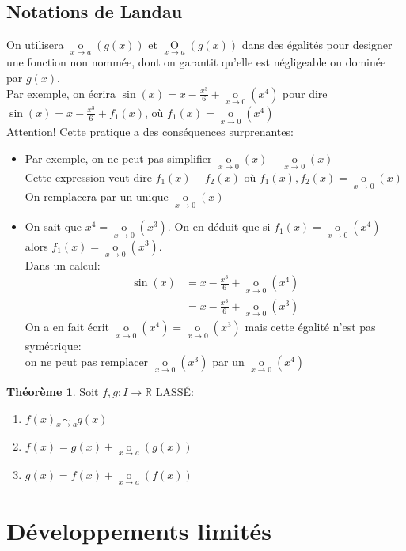 \documentclass[10pt,a4paper]{article}
\theoremstyle{definition}
\newtheorem{theorem}[proposition]{Théorème}
\DeclareMathOperator*{\eqv}{\sim}
\DeclareMathOperator*{\negl}{o}
\DeclareMathOperator*{\dom}{O}
\begin{document}
\pagebreak

\subsection{Notations de Landau}
On utilisera $\negl\limits_{x \to a}(g(x))$ et $\dom\limits_{x \to a}(g(x))$ dans des égalités pour designer une fonction non nommée, dont on garantit qu'elle est négligeable ou dominée par $g(x)$. \\
Par exemple, on écrira $\sin(x) = x - \frac{x^3}{6} + \negl\limits_{x \to 0}(x^4)$ pour dire $\sin(x) = x - \frac{x^3}{6} + f_1(x)$, où $f_1(x) = \negl\limits_{x \to 0}(x^4)$ \\
Attention! Cette pratique a des conséquences surprenantes:
\begin{itemize}
\item Par exemple, on ne peut pas simplifier $\negl\limits_{x \to 0}(x) - \negl\limits_{x \to 0}(x)$ \\
Cette expression veut dire $f_1(x) - f_2(x)$ où $f_1(x), f_2(x) = \negl\limits_{x \to 0}(x)$ \\
On remplacera par un unique $\negl\limits_{x \to 0}(x)$
\item On sait que $x^4 = \negl\limits_{x \to 0}(x^3)$. On en déduit que si $f_1(x) = \negl\limits_{x \to 0}(x^4)$ alors $f_1(x) = \negl\limits_{x \to 0}(x^3)$. \\
Dans un calcul:
\begin{align*}
\sin(x) &= x - \frac{x^3}{6} + \negl\limits_{x \to 0}(x^4) \\
        &= x - \frac{x^3}{6} + \negl\limits_{x \to 0}(x^3)
\end{align*}
On a en fait écrit $\negl\limits_{x \to 0}(x^4) = \negl\limits_{x \to 0}(x^3)$ mais cette égalité n'est pas symétrique: \\
on ne peut pas remplacer $\negl\limits_{x \to 0}(x^3)$ par un $\negl\limits_{x \to 0}(x^4)$
\end{itemize}
\begin{theorem}
Soit $f,g: I \to \mathbb{R}$ LASSÉ:
\begin{enumerate}
\item $f(x) \eqv\limits_{x \to a} g(x)$
\item $f(x) = g(x) + \negl\limits_{x \to a}(g(x))$
\item $g(x) = f(x) + \negl\limits_{x \to a}(f(x))$
\end{enumerate}
\end{theorem}

\section{Développements limités}
\end{document}
